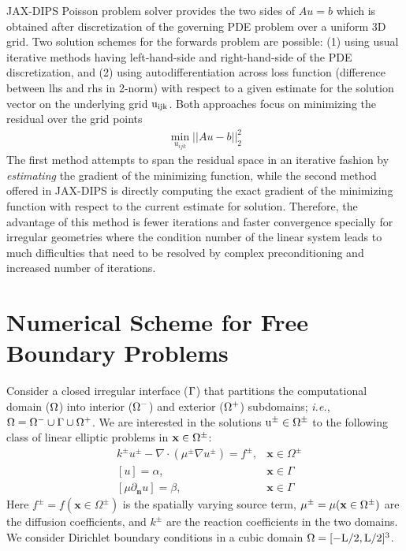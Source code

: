 \documentclass{elsarticle}
\begin{document}
JAX-DIPS Poisson problem solver provides the two sides of $A u =b$ which is obtained after discretization of the governing PDE problem over a uniform 3D grid. Two solution schemes for the forwards problem are possible: (1) using usual iterative methods having left-hand-side and right-hand-side of the PDE discretization, and (2) using autodifferentiation across loss function (difference between lhs and rhs in 2-norm) with respect to a given estimate for the solution vector on the underlying grid $\rm u_{ijk}$. Both approaches focus on minimizing the residual over the grid points
\begin{align*}
	\min_{u_{ijk}} \vert\vert Au -b \vert \vert^2_2
\end{align*}
The first method attempts to span the residual space in an iterative fashion by \textit{estimating} the gradient of the minimizing function, while the second method offered in JAX-DIPS is directly computing the exact gradient of the minimizing function with respect to the current estimate for solution. Therefore, the advantage of this method is fewer iterations and faster convergence specially for irregular geometries where the condition number of the linear system leads to much difficulties that need to be resolved by complex preconditioning and increased number of iterations.



\section{Numerical Scheme for Free Boundary Problems}
Consider a closed irregular interface ($\rm \Gamma$) that partitions the computational domain ($\rm \Omega$) into interior ($\rm \Omega^-$) and exterior ($\rm \Omega^+$) subdomains; \textit{i.e.}, $\rm \Omega=\Omega^- \cup \Gamma \cup \Omega^+$. We are interested in the solutions $\rm u^\pm\in \Omega^\pm$ to the following class of linear elliptic problems in  $\rm \mathbf{x}\in\Omega^\pm$:
\begin{align*}
	 & k^{\pm}u^{\pm} - \nabla \cdot (\mu^{\pm}\nabla u^\pm)=f^{\pm}, & \mathbf{x}\in\Omega^\pm \\
	 & [u]=\alpha,                                                    & \mathbf{x} \in \Gamma   \\
	 & [\mu \partial_{\mathbf{n}}u]=\beta,                            & \mathbf{x} \in \Gamma
\end{align*}
Here $f^\pm=f(\mathbf{x} \in \Omega^\pm)$ is the spatially varying source term, $\rm \mu^\pm=\mu(\mathbf{x} \in \Omega^\pm)$  are the diffusion coefficients, and $k^\pm$ are the reaction coefficients in the two domains. We consider Dirichlet boundary conditions in a cubic domain $\rm \Omega=[-L/2,L/2]^3$.
\end{document}
